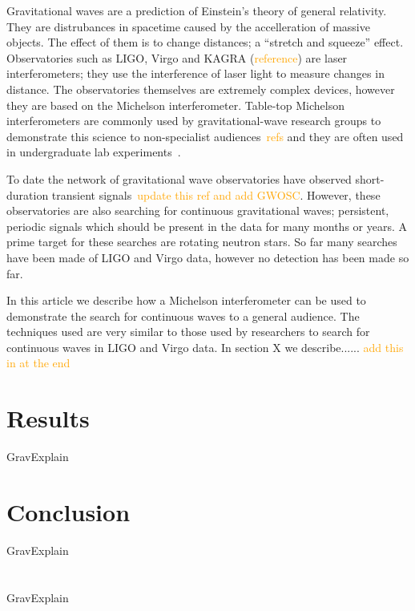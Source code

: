 \documentclass[prb,preprint]{revtex4-1}
\newcommand{\han}{\textcolor{orange}}
\begin{document}
Gravitational waves are a prediction of Einstein's theory of general relativity. 
They are distrubances in spacetime caused by the accelleration of massive objects. 
The effect of them is to change distances; a ``stretch and squeeze'' effect. 
Observatories such as LIGO, Virgo and KAGRA (\han{reference}) are laser interferometers; they use the interference of laser light to measure changes in distance. 
The observatories themselves are extremely complex devices, however they are based on the Michelson interferometer. 
Table-top Michelson interferometers are commonly used by gravitational-wave research groups to demonstrate this science to non-specialist audiences~\cite{}\han{refs} and they are often used in undergraduate lab experiments~\cite{UgoliniEtAl:2019}. 


To date the network of gravitational wave observatories have observed short-duration transient signals~\cite{GWTC-1:2018}\han{update this ref and add GWOSC}. 
However, these observatories are also searching for continuous gravitational waves; persistent, periodic signals which should be present in the data for many months or years. 
A prime target for these searches are rotating neutron stars. 
So far many searches have been made of LIGO and Virgo data, however no detection has been made so far. 


In this article we describe how a Michelson interferometer can be used to demonstrate the search for continuous waves to a general audience. 
The techniques used are very similar to those used by researchers to search for continuous waves in LIGO and Virgo data. 
In section X we describe...... \han{add this in at the end}





\section{Results}
GravExplain


\section{Conclusion}
GravExplain


\appendix
\section{}
GravExplain
\end{document}

